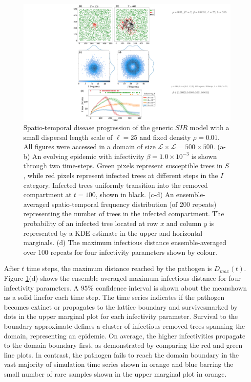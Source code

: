\begin{figure}
    \centering
    \includegraphics[scale=0.48]{chapter5/figures/fig1-sir-spatio-temporal.pdf}
    \caption{Spatio-temporal disease progression of the generic $SIR$ model with a small dispersal length scale of $\ell = 25$ and fixed density $\rho=0.01$. All figures were accessed in a domain of size $\mathcal{L} \times \mathcal{L} = 500 \times 500$. (a-b) An evolving epidemic with infectivity $\beta=1.0\times 10^{-3}$ is shown through two time-steps. Green pixels represent susceptible trees in $S$, while red pixels represent infected trees at different steps in the $I$ category. Infected trees uniformly transition into the removed compartment at $t=100$, shown in black. (c-d) An ensemble-averaged spatio-temporal frequency distribution (of 200 repeats) representing the number of trees in the infected compartment. The probability of an infected tree located at row $x$ and column $y$ is represented by a KDE estimate in the upper and horizontal marginals. (d) The maximum infectious distance ensemble-averaged over 100 repeats for four infectivity parameters shown by colour.}
\label{fig:sgm-evol}
\end{figure}

After $t$ time steps, the maximum distance reached by the pathogen is $D_{max}(t)$.
Figure \ref{fig:sgm-evol}(d) shows the ensemble-averaged maximum infectious distance for four infectivity parameters.
A $95\%$ confidence interval is shown about the mean\textemdash shown as a solid line\textemdash for each time step. 
The time series indicates if the pathogen becomes extinct or propagates to the lattice boundary and survives\textemdash marked by dots in the upper marginal plot for each infectivity parameter.
Survival to the boundary approximate defines a cluster of infectious-removed trees spanning the domain, representing an epidemic.
On average, the higher infectivities propagate to the domain boundary first, as demonstrated by comparing the red and green line plots.
In contrast, the pathogen fails to reach the domain boundary in the vast majority of simulation time series shown in orange and blue
\textemdash barring the small number of rare samples shown in the upper marginal plot in orange.

